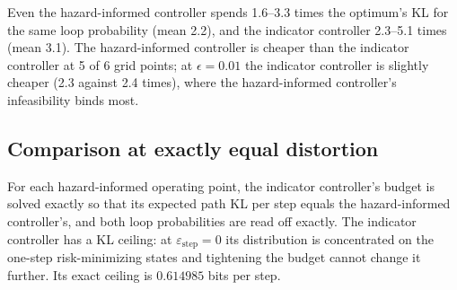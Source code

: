 \begin{table}[ht]
\centering
\caption{The event-level optimum and two local controllers (repeat indicator; exact hazard), all matched to the same loop probability $\varepsilon$ within the horizon $H{=}6$. The optimum's achieved $\varepsilon$ matches the target to numerical precision (residual $<10^{-10}$), and the local controllers' to within bisection tolerance ($<10^{-9}$); all are exact, not simulated. KL/step is total path KL divided by $H$, in bits. \textbf{Infeasible}: probability-mass-weighted fraction of steps at which the hazard-informed controller's one-step budget was structurally below its achievable floor.}
\label{tab:oracle}
\end{table}

Even the hazard-informed controller spends 1.6--3.3 times the optimum's KL for the same loop probability (mean 2.2), and the indicator controller 2.3--5.1 times (mean 3.1). The hazard-informed controller is cheaper than the indicator controller at 5 of 6 grid points; at $\epsilon{=}0.01$ the indicator controller is slightly cheaper (2.3 against 2.4 times), where the hazard-informed controller's infeasibility binds most.

\subsection{Comparison at exactly equal distortion}
For each hazard-informed operating point, the indicator controller's budget is solved exactly so that its expected path KL per step equals the hazard-informed controller's, and both loop probabilities are read off exactly. The indicator controller has a KL ceiling: at $\varepsilon_{\text{step}}{=}0$ its distribution is concentrated on the one-step risk-minimizing states and tightening the budget cannot change it further. Its exact ceiling is $0.614985$ bits per step.

